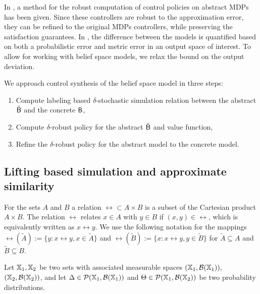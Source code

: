 \documentclass{ifacconf}
\begin{document}
In \citet{tech_report_TACAS}, a method for the robust computation of control policies on abstract MDPs has been given.  Since these controllers are robust to the approximation error,  they can be refined to the original MDPs controllers, while preserving the satisfaction guarantees. 
In \citet{tech_report_TACAS}, the difference between the models is quantified based on both a probabilistic error and metric error in an output space of interest. 
To allow for working with belief space models, we relax the bound on the output deviation.


We approach control synthesis of the belief space model in three steps:
\begin{enumerate}
\item Compute labeling based $\delta$-stochastic  simulation relation between  the abstract $\tilde{\mathsf{B}}$ and the concrete $\mathsf{B}$,
\item Compute $\delta$-robust policy for the abstract $\tilde{\mathsf{B}}$ and value function,
\item Refine the $\delta$-robust policy for the abstract model to the concrete model.
\end{enumerate}
\subsection{Lifting based simulation  and approximate similarity}
For the sets $A$ and $B$ a relation $\rel\subset A\times B$ is a subset of the Cartesian product $A\times B$. The relation $\rel$ relates $x\in A$ with $y\in B$ if $(x,y)\in\rel$, which is equivalently written as $x\rel y$. 
We use the following notation for the mappings  $\rel(\tilde A):=\{y: x\rel y, x\in \tilde A\}$ and  $\rel( \tilde B):=\{x: x\rel y, y\in \tilde B\}$ for   $\tilde A\subseteq A$ and $\tilde B \subseteq B$.

	Let ${\mathbb{X}}_1,{\mathbb{X}}_2$ be two sets with associated measurable spaces $({\mathbb{X}}_1,\mathcal B({\mathbb{X}}_1)),$ $({\mathbb{X}}_2,\mathcal B({\mathbb{X}}_2))$,
	and let   $\Delta\in \mathcal{P}({\mathbb{X}}_1,\mathcal B({\mathbb{X}}_1)) $ and  $\Theta\in \mathcal{P}({\mathbb{X}}_1,\mathcal B({\mathbb{X}}_2)) $ be two probability distributions. 
%	
\end{document}
